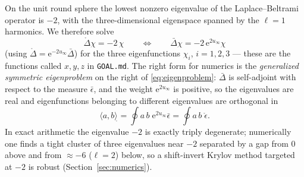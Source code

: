 \documentclass[11pt]{article}
\newcommand{\ee}{\mathrm{e}}
\newcommand{\epso}{\mathring{\epsilon}} %
\newcommand{\Lapo}{\mathring{\Delta}}   %
\begin{document}
On the unit round sphere the lowest nonzero eigenvalue of the
Laplace--Beltrami operator is $-2$, with the three-dimensional eigenspace
spanned by the $\ell=1$ harmonics.  We therefore solve
\begin{equation}
  \Lapo \chi = -2\,\chi
  \qquad\Longleftrightarrow\qquad
  \bar\Delta \chi = -2\,\ee^{2u_\infty}\chi
  \label{eq:eigenproblem}
\end{equation}
(using $\Lapo = \ee^{-2u_\infty}\bar\Delta$) for the three eigenfunctions
$\chi_i$, $i=1,2,3$ --- these are the functions called $x,y,z$ in
\texttt{GOAL.md}.  The right form for numerics is the \emph{generalized
symmetric eigenproblem} on the right of \eqref{eq:eigenproblem}: $\bar\Delta$
is self-adjoint with respect to the measure $\bar\epsilon$, and the weight
$\ee^{2u_\infty}$ is positive, so the eigenvalues are real and eigenfunctions
belonging to different eigenvalues are orthogonal in
\begin{equation}
  \langle a,b\rangle_{\mathring{}}
  = \oint a\,b\;\ee^{2u_\infty}\bar\epsilon
  = \oint a\,b\;\epso .
\end{equation}
In exact arithmetic the eigenvalue $-2$ is exactly triply degenerate;
numerically one finds a tight cluster of three eigenvalues near $-2$
separated by a gap from $0$ above and from $\approx-6$ ($\ell=2$) below, so a
shift-invert Krylov method targeted at $-2$ is robust
(Section~\ref{sec:numerics}).
\end{document}
